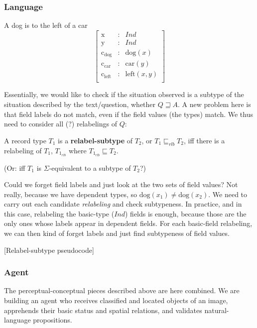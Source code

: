\documentclass[11pt, a4paper]{article}
\begin{document}
\subsubsection{Language}

A dog is to the left of a car
\begin{equation}\left[\begin{array}{rcl}
\text{x} &:& Ind\\
\text{y} &:& Ind\\
\text{c}_\text{dog} &:& \text{dog}(x)\\
\text{c}_\text{car} &:& \text{car}(y)\\
\text{c}_\text{left} &:& \text{left}(x, y)\\
\end{array}\right]\end{equation}


Essentially, we would like to check if the situation observed is a subtype of the situation described by the text/question, whether $Q \sqsupseteq A$. A new problem here is that field labels do not match, even if the field values (the types) match. We thus need to consider all (?) relabelings of $Q$:

A record type $T_1$ is a \textbf{relabel-subtype} of $T_2$, or $T_1 \sqsubseteq_{rlb} T_2$,  iff there is a relabeling of $T_1$, $T_{1_{rlb}}$ where $T_{1_{rlb}} \sqsubseteq T_2$.

(Or: iff $T_1$ is $\Sigma$-equivalent to a subtype of $T_2$?)

Could we forget field labels and just look at the two sets of field values? Not really, because we have dependent types, so $\text{dog}(x_1) ≠ \text{dog}(x_2)$. We need to carry out each candidate \textit{relabeling} and check subtypeness. In practice, and in this case, relabeling the basic-type ($Ind$) fields is enough, because those are the only ones whose labels appear in dependent fields. For each basic-field relabeling, we can then kind of forget labels and just find subtypeness of field values.

[Relabel-subtype pseudocode]



\subsubsection{Agent}

The perceptual-conceptual pieces described above are here combined.
We are building an agent who receives classified and located objects of an image, apprehends their basic status and spatial relations, and validates natural-language propositions.
\end{document}
